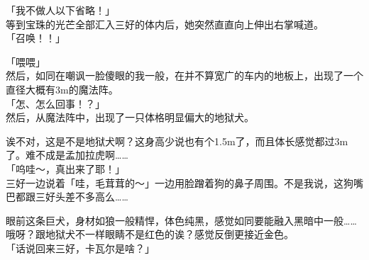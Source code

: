 「我不做人以下省略！」\\

等到宝珠的光芒全部汇入三好的体内后，她突然直直向上伸出右掌喊道。\\

「召唤！！」

「喂喂」\\

然后，如同在嘲讽一脸傻眼的我一般，在并不算宽广的车内的地板上，出现了一个直径大概有3m的魔法阵。\\

「怎、怎么回事！？」\\

然后，从魔法阵中，出现了一只体格明显偏大的地狱犬。

诶不对，这是不是地狱犬啊？这身高少说也有个1.5m了，而且体长感觉都过3m了。难不成是孟加拉虎啊……\\

「呜哇～，真出来了耶！」\\

三好一边说着「哇，毛茸茸的～」一边用脸蹭着狗的鼻子周围。不是我说，这狗嘴巴都跟三好头差不多高么……

眼前这条巨犬，身材如狼一般精悍，体色纯黑，感觉如同要能融入黑暗中一般……哦呀？跟地狱犬不一样眼睛不是红色的诶？感觉反倒更接近金色。\\

「话说回来三好，卡瓦尔是啥？」

